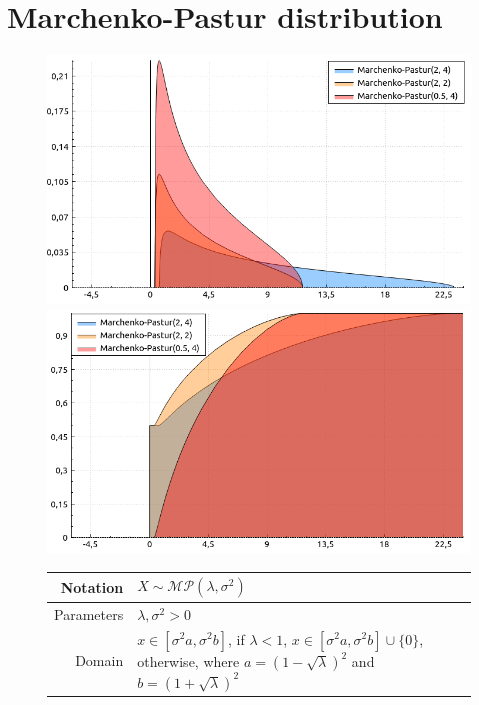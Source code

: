 \documentclass[a4paper,11pt]{article}
\theoremstyle{plain}
\theoremstyle{definition}
\begin{document}
	\section{Marchenko-Pastur distribution}
	\begin{figure}[!htb]\centering
		\begin{minipage}{0.55\textwidth}
			\includegraphics[width=\linewidth, right]{marchenko_pastur_pdf}
			\captionsetup{labelformat=empty}
			\includegraphics[width=\linewidth, right]{marchenko_pastur_cdf}
			\captionsetup{labelformat=empty}
		\end{minipage}
		\begin{minipage}{0.4\textwidth}
			\begin{tabular}{| r | l |}
				\hline
				Notation & $X \sim \mathcal{MP}(\lambda, \sigma^2)$ \\
				\hline
				Parameters & $\lambda, \sigma^2 > 0$ \\
				\hline
				Domain & 
				\pbox{\linewidth}{$x \in [\sigma^2 a, \sigma^2 b]$, if  $\lambda < 1$, \\  $ x \in [\sigma^2 a, \sigma^2 b] \cup \{0\} $, otherwise, \\ where $a=(1-\sqrt{\lambda})^2$ and $b=(1+\sqrt{\lambda})^2$} \\

\end{tabular}
\end{minipage}
\end{figure}
\end{document}
